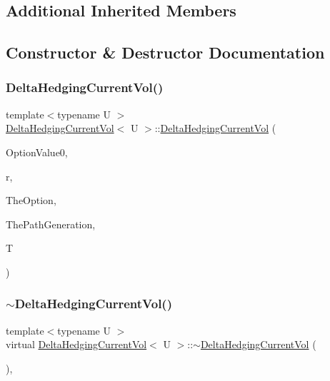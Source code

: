 \subsection*{Additional Inherited Members}


\subsection{Constructor \& Destructor Documentation}
\hypertarget{classDeltaHedgingCurrentVol_addf10fb5cc82a446b879da2951525a43}{}\label{classDeltaHedgingCurrentVol_addf10fb5cc82a446b879da2951525a43} 
\subsubsection{\texorpdfstring{Delta\+Hedging\+Current\+Vol()}{DeltaHedgingCurrentVol()}}
{\footnotesize\ttfamily template$<$typename U $>$ \\
\hyperlink{classDeltaHedgingCurrentVol}{Delta\+Hedging\+Current\+Vol}$<$ U $>$\+::\hyperlink{classDeltaHedgingCurrentVol}{Delta\+Hedging\+Current\+Vol} (\begin{DoxyParamCaption}\item[{double}]{Option\+Value0,  }\item[{double}]{r,  }\item[{shared\+\_\+ptr$<$ U $>$}]{The\+Option,  }\item[{shared\+\_\+ptr$<$ \hyperlink{classPathGenerationHeston}{Path\+Generation\+Heston} $>$}]{The\+Path\+Generation,  }\item[{double}]{T }\end{DoxyParamCaption})}

\hypertarget{classDeltaHedgingCurrentVol_adcd16ce7b2d61e715167ee2ee94315ce}{}\label{classDeltaHedgingCurrentVol_adcd16ce7b2d61e715167ee2ee94315ce} 
\subsubsection{\texorpdfstring{$\sim$\+Delta\+Hedging\+Current\+Vol()}{~DeltaHedgingCurrentVol()}}
{\footnotesize\ttfamily template$<$typename U $>$ \\
virtual \hyperlink{classDeltaHedgingCurrentVol}{Delta\+Hedging\+Current\+Vol}$<$ U $>$\+::$\sim$\hyperlink{classDeltaHedgingCurrentVol}{Delta\+Hedging\+Current\+Vol} (\begin{DoxyParamCaption}{ }\end{DoxyParamCaption})\hspace{0.3cm}{\ttfamily [inline]}, {\ttfamily [virtual]}}



